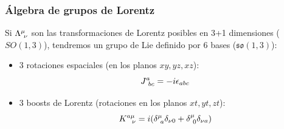 \documentclass[]{article}
\numberwithin{equation}{section}
\begin{document}
\subsubsection{Álgebra de grupos de Lorentz}
Si \(\LambdaMuNu\) son las transformaciones de Lorentz posibles en 3+1 dimensiones (\(SO(1,3)\)), tendremos un grupo de Lie definido por 6 bases (\(\mathfrak{so}(1,3)\)):
\begin{itemize}
	\item 3 rotaciones espaciales (en los planos \(xy, yz, xz\)):
	\begin{equation}
		\indUpDown[J][a][bc] = -i \epsilon_{abc}
	\end{equation}
	\item 3 boosts de Lorentz (rotaciones en los planos \(xt, yt, zt\)):
	\begin{equation}
		\indUpDown[K][a\mu][\ \nu] = i(\indUpDown[\delta][\mu][a]\delta_{\nu 0} + \indUpDown[\delta][\mu][0]\delta_{\nu a})
	\end{equation}
\end{itemize}
\end{document}

